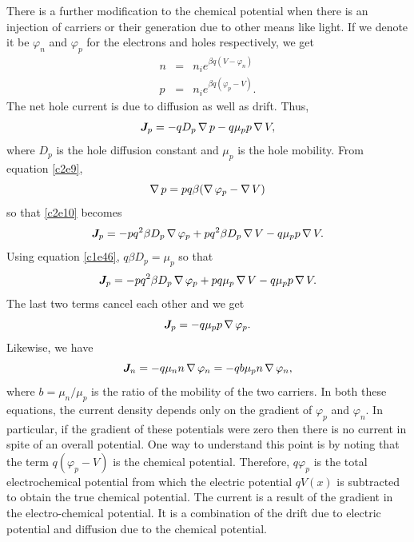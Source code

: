 There is a further modification to the chemical potential when there is an
injection of carriers or their generation due to other means like light. If
we denote it be $\varphi_n$ and $\varphi_p$ for the electrons and holes
respectively, we get
\begin{eqnarray}
n &=& n_i e^{\beta q(V - \varphi_n)} \label{c2e8} \\
p &=& n_i e^{\beta q(\varphi_p - V)}. \label{c2e9}
\end{eqnarray}
The net hole current is due to diffusion as well as drift. Thus,
\begin{equation}\label{c2e10}
\bm{J}_p = -qD_p\operatorname{\nabla}{p} - q\mu_p p \operatorname{\nabla}{V},
\end{equation}
where $D_p$ is the hole diffusion constant and $\mu_p$ is the hole mobility.
From equation \eqref{c2e9},
\[
\operatorname{\nabla} p = pq\beta(\operatorname{\nabla}\varphi_p - \operatorname{\nabla} V)
\]
so that \eqref{c2e10} becomes
\[
\bm{J}_p = -pq^2\beta D_p\operatorname{\nabla}\varphi_p + pq^2\beta D_p\operatorname{\nabla} V - 
q\mu_p p\operatorname{\nabla}{V}.
\]
Using equation \eqref{c1e46}, $q\beta D_p = \mu_p$ so that
\[
\bm{J}_p = -pq^2\beta D_p\operatorname{\nabla}\varphi_p + pq\mu_p\operatorname{\nabla} V - 
q\mu_p p\operatorname{\nabla}{V}.
\]
The last two terms cancel each other and we get
\begin{equation}\label{c2e11}
\bm{J}_p = -q\mu_p p \operatorname{\nabla}\varphi_p.
\end{equation}
Likewise, we have
\begin{equation}\label{c2e12}
\bm{J}_n = -q\mu_n n \operatorname{\nabla}\varphi_n = -qb\mu_p n\operatorname{\nabla}\varphi_n,
\end{equation}
where $b = \mu_n/\mu_p$ is the ratio of the mobility of the two carriers. In
both these equations, the current density depends only on the gradient of 
$\varphi_p$ and $\varphi_n$. In particular, if the gradient of these potentials
were zero then there is no current in spite of an overall potential. One way
to understand this point is by noting that the term $q(\varphi_p - V)$ is the
chemical potential. Therefore, $q\varphi_p$ is the total electrochemical 
potential from which the electric potential $qV(x)$ is subtracted to obtain the
true chemical potential. The current is a result of the gradient in the 
electro-chemical potential. It is a combination of the drift due to electric 
potential and diffusion due to the chemical potential.

